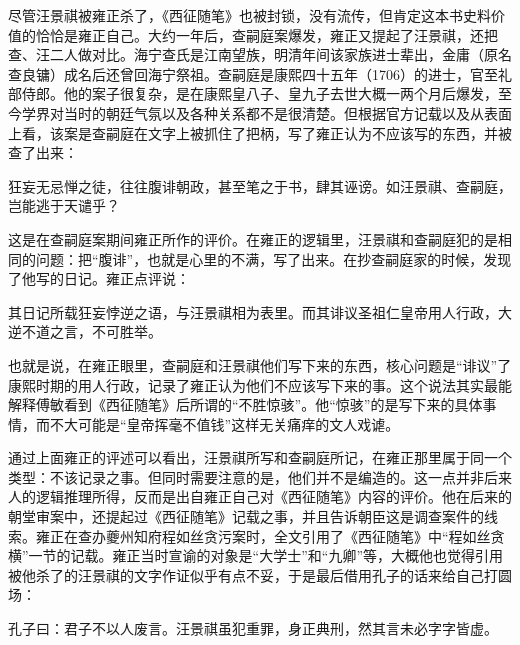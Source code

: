
尽管汪景祺被雍正杀了，《西征随笔》也被封锁，没有流传，但肯定这本书史料价值的恰恰是雍正自己。大约一年后，查嗣庭案爆发，雍正又提起了汪景祺，还把查、汪二人做对比。海宁查氏是江南望族，明清年间该家族进士辈出，金庸（原名查良镛）成名后还曾回海宁祭祖。查嗣庭是康熙四十五年（1706）的进士，官至礼部侍郎。他的案子很复杂，是在康熙皇八子、皇九子去世大概一两个月后爆发，至今学界对当时的朝廷气氛以及各种关系都不是很清楚。但根据官方记载以及从表面上看，该案是查嗣庭在文字上被抓住了把柄，写了雍正认为不应该写的东西，并被查了出来：



\begin{bookquote}狂妄无忌惮之徒，往往腹诽朝政，甚至笔之于书，肆其诬谤。如汪景祺、查嗣庭，岂能逃于天谴乎？\end{bookquote}


这是在查嗣庭案期间雍正所作的评价。在雍正的逻辑里，汪景祺和查嗣庭犯的是相同的问题：把“腹诽”，也就是心里的不满，写了出来。在抄查嗣庭家的时候，发现了他写的日记。雍正点评说：



\begin{bookquote}其日记所载狂妄悖逆之语，与汪景祺相为表里。而其诽议圣祖仁皇帝用人行政，大逆不道之言，不可胜举。\end{bookquote}


也就是说，在雍正眼里，查嗣庭和汪景祺他们写下来的东西，核心问题是“诽议”了康熙时期的用人行政，记录了雍正认为他们不应该写下来的事。这个说法其实最能解释傅敏看到《西征随笔》后所谓的“不胜惊骇”。他“惊骇”的是写下来的具体事情，而不大可能是“皇帝挥毫不值钱”这样无关痛痒的文人戏谑。



通过上面雍正的评述可以看出，汪景祺所写和查嗣庭所记，在雍正那里属于同一个类型：不该记录之事。但同时需要注意的是，他们并不是编造的。这一点并非后来人的逻辑推理所得，反而是出自雍正自己对《西征随笔》内容的评价。他在后来的朝堂审案中，还提起过《西征随笔》记载之事，并且告诉朝臣这是调查案件的线索。雍正在查办夔州知府程如丝贪污案时，全文引用了《西征随笔》中“程如丝贪横”一节的记载。雍正当时宣谕的对象是“大学士”和“九卿”等，大概他也觉得引用被他杀了的汪景祺的文字作证似乎有点不妥，于是最后借用孔子的话来给自己打圆场：



\begin{bookquote}孔子曰：君子不以人废言。汪景祺虽犯重罪，身正典刑，然其言未必字字皆虚。\end{bookquote}

